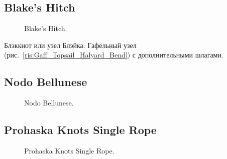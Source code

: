 \subsection{Blake's Hitch}

\begin{figure}[H]\centering
\hfil
	\caption{Blake's Hitch.}\label{ris:Blakes_Hitch}
\end{figure}

Блэккнот или узел Блэйка. Гафельный узел (рис.~\ref{ris:Gaff_Topsail_Halyard_Bend}) с дополнительными шлагами.

\subsection{Nodo Bellunese}

\begin{figure}[H]\centering
	\begin{minipage}{1\linewidth}
		\begin{center}
			\tcbox[enhanced jigsaw,colframe=black,opacityframe=0.5,opacityback=0.5]
			{\centering{}}
		\end{center}
	\end{minipage}
\caption{Nodo Bellunese.}
\label{ris:Nodo_Bellunese}
\end{figure}

\subsection{Prohaska Knots Single Rope}

\begin{figure}[H]\centering
	\begin{minipage}{1\linewidth}
		\begin{center}
			\tcbox[enhanced jigsaw,colframe=black,opacityframe=0.5,opacityback=0.5]
			{\centering{}}
		\end{center}
	\end{minipage}
\caption{Prohaska Knots Single Rope.}
\label{ris:Prohaska_Knots_Single_Rope}
\end{figure}

